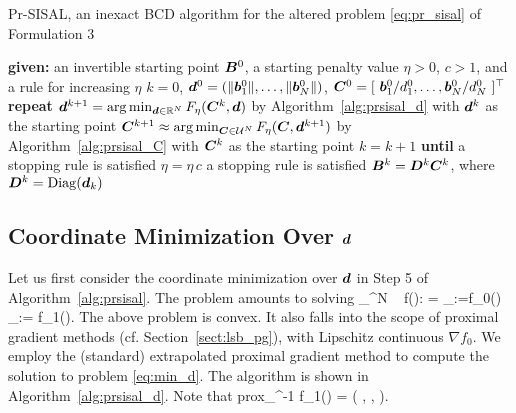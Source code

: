 \documentclass[10pt,twocolumn,twoside]{IEEEtran}
\begin{document}
\begin{algorithm}[hbt]
	\caption{Pr-SISAL, an inexact BCD algorithm for the altered problem \eqref{eq:pr_sisal} of Formulation 3} \label{alg:prsisal}
	\begin{algorithmic}[1]
		\STATE \textbf{given:} an invertible starting point ${\bm B}^0$, a starting penalty value $\eta > 0$, $c > 1$, and a rule for increasing $\eta$
		\STATE $k= 0$, ${\bm d}^0 = ( \| {\bm b}_1^0 \|, \ldots, \| {\bm b}_N^0 \| )$, ${\bm C}^0 = [~ {\bm b}_1^0/d_1^0, \ldots, {\bm b}_N^0/d_N^0 ~]^\top$
		\STATE \hspace{1em} {\bf repeat}
		\STATE \hspace{2em} ${\bm d}^{k+1} = \arg \min_{{\bm d} \in \mathbb{R}^N} F_\eta({\bm C}^k,{\bm d})$ by Algorithm~\ref{alg:prsisal_d} with ${\bm d}^k$ as the starting point
		\STATE \hspace{2em} ${\bm C}^{k+1} \approx \arg \min_{{\bm C} \in \mathcal{U}^N} F_\eta({\bm C},{\bm d}^{k+1})$ by Algorithm~\ref{alg:prsisal_C} with ${\bm C}^k$ as the starting point
		\STATE \hspace{2em} $k= k+1$
		\STATE \hspace{1em} {\bf until} a stopping rule is satisfied
		\STATE \hspace{1em} $\eta = \eta \, c$			
		 a stopping rule is satisfied
		 ${\bm B}^k = {\bm D}^k {\bm C}^k$, where ${\bm D}^k = {\rm Diag}({\bm d}_k)$
	\end{algorithmic}
\end{algorithm}


\subsection{Coordinate Minimization Over ${\bm d}$}

Let us first consider the coordinate minimization over ${\bm d}$ in Step 5 of Algorithm~\ref{alg:prsisal}.
The problem amounts to solving
\beq \label{eq:min_d}
\min_{\bd \in \Rbb^N} ~ f(\bd): = _{:=f_0(\bd)}  _{:= f_1(\bd)}.
\eeq
The above problem is convex.
It also falls into the scope of proximal gradient methods (cf. Section~\ref{sect:lsb_pg}), with Lipschitz continuous $\nabla f_0$.
We employ the (standard) extrapolated proximal gradient method to compute the solution to problem \eqref{eq:min_d}.
The algorithm is shown in Algorithm~\ref{alg:prsisal_d}.
Note that
\beq \label{eq:prox_log}
{\rm prox}_{\mu^{-1} f_1}(\bd) = \left( , \cdots,      \right).
\eeq
\end{document}
